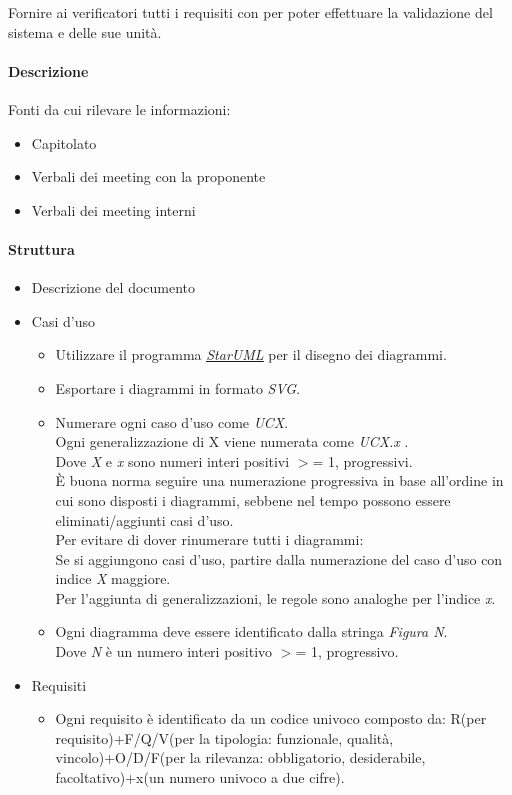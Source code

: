 \documentclass[a4paper, 12pt]{article}
\begin{document}
Fornire ai verificatori tutti i requisiti con per poter effettuare la validazione del sistema e delle sue unità.
\paragraph{Descrizione}
Fonti da cui rilevare le informazioni:
\begin{itemize}
	\item Capitolato
	\item Verbali dei meeting con la proponente
	\item Verbali dei meeting interni
\end{itemize}
\paragraph{Struttura}
\begin{itemize}
	\item Descrizione del documento
	\item Casi d'uso
	\begin{itemize}
		\item Utilizzare il programma \href{https://staruml.io/}{\textit{\underline{StarUML}}} per il disegno dei diagrammi.
		\item Esportare i diagrammi in formato \textit{SVG}.
		\item Numerare ogni caso d'uso come \textit{UCX}. \\
		Ogni generalizzazione di X viene numerata come \textit{UCX.x} .\\
		Dove \textit{X} e \textit{x} sono numeri interi positivi $>$= 1, progressivi.\\
		\`E buona norma seguire una numerazione progressiva in base all'ordine in cui sono
		disposti i diagrammi, sebbene nel tempo possono essere eliminati/aggiunti casi d'uso.\\
		Per evitare di dover rinumerare tutti i diagrammi: \\
		Se si aggiungono casi d'uso, partire dalla numerazione del caso d'uso con indice \textit{X} maggiore.\\
		Per l'aggiunta di generalizzazioni, le regole sono analoghe per l'indice \textit{x}.
		\item Ogni diagramma deve essere identificato dalla stringa \textit{Figura N}.\\
		Dove \textit{N} è un numero interi positivo $>$= 1, progressivo.
	\end{itemize}
	\item Requisiti
	\begin{itemize}
		\item Ogni requisito è identificato da un codice univoco composto da: R(per requisito)+F/Q/V(per la tipologia:
		funzionale, qualità, vincolo)+O/D/F(per la rilevanza: obbligatorio, desiderabile,
		facoltativo)+x(un numero univoco a due cifre).
	\end{itemize}
\end{itemize}
\end{document}
